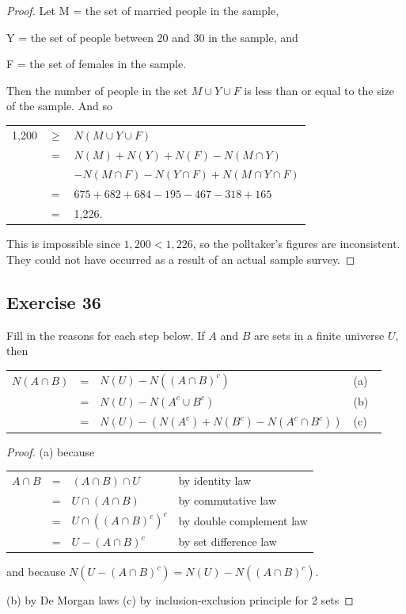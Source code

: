 \documentclass[14pt]{extarticle}
\newcommand{\fbl}{\underline{\hspace{1cm}}\,\,}
\newcommand{\cy}{\color{cyan}}
\begin{document}
\begin{proof}
Let M = the set of married people in the sample,

Y = the set of people between 20 and 30 in the sample, and

F = the set of females in the sample.

Then the number of people in the set \(M \cup Y \cup F\) is less than or equal to the size of the sample. And so 

\begin{tabular}{rcl}
1,200 & \(\geq\) & \(N(M \cup Y \cup F)\) \\
& = & \(N(M) + N(Y) + N(F) - N(M \cap Y)\) \\
&   & \(-N(M \cap F) -N(Y \cap F) + N(M \cap Y \cap F)\) \\ 
& = & \(675 + 682 + 684 - 195 - 467 - 318 + 165\) \\
& = & 1,226.
\end{tabular}

This is impossible since \(1,200 < 1,226\), so the polltaker’s figures are inconsistent. They could not have 
occurred as a result of an actual sample survey.
\end{proof}

\subsection{Exercise 36}
Fill in the reasons for each step below. If $A$ and $B$ are sets in a finite universe $U$, then
\begin{center}
\begin{tabular}{rcll}
\(N(A \cap B)\) & = & \(N(U) - N((A \cap B)^c)\) & {\cy (a) \fbl} \\
& = & \(N(U) - N(A^c \cup B^c)\) & {\cy (b) \fbl} \\
& = & \(N(U) - (N(A^c) + N(B^c) - N(A^c \cap B^c))\) & {\cy (c) \fbl}
\end{tabular}
\end{center}
\begin{proof}
(a) because 
\begin{center}
\begin{tabular}{rcll}
\(A \cap B\) & = & \((A \cap B) \cap U\) & by identity law \\
& = & \(U \cap (A \cap B)\) & by commutative law \\
& = & \(U \cap ((A \cap B)^c)^c\) & by double complement law \\
& = & \(U - (A \cap B)^c\) & by set difference law \\
\end{tabular}
\end{center}
and because \(N(U - (A \cap B)^c) = N(U) - N((A \cap B)^c)\).

(b) by De Morgan laws (c) by inclusion-exclusion principle for 2 sets
\end{proof}
\end{document}
